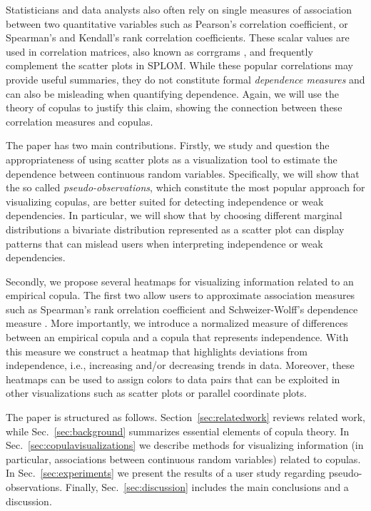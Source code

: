 \documentclass[journal]{vgtc}                %
\begin{document}
Statisticians and data analysts also often rely on single measures of association between two quantitative variables such as Pearson's correlation coefficient, or Spearman's and Kendall's rank correlation coefficients. These scalar values are used in correlation matrices, also known as corrgrams \cite{Friendly02}, and frequently complement the scatter plots in SPLOM. While these popular correlations may provide useful summaries, they do not constitute formal \textit{dependence measures} and can also be misleading when quantifying dependence. Again, we will use the theory of copulas to justify this claim, showing the connection between these correlation measures and copulas.


The paper has two main contributions. Firstly, we study and question the appropriateness of using scatter plots as a visualization tool to estimate the dependence between continuous random variables. Specifically, we will show that the so called \textit{pseudo-observations}, which constitute the most popular approach for visualizing copulas, are better suited for detecting independence or weak dependencies. In particular, we will show that by choosing different marginal distributions a bivariate distribution represented as a scatter plot can display patterns that can mislead users when interpreting independence or weak dependencies.

Secondly, we propose several heatmaps for visualizing information related to an empirical copula. The first two allow users to approximate association measures such as Spearman's rank orrelation coefficient and Schweizer-Wolff's dependence measure \cite{Schweizer1981}. More importantly, we introduce a normalized measure of differences between an empirical copula and a copula that represents independence. With this measure we construct a heatmap that highlights deviations from independence, i.e., increasing and/or decreasing trends in data. Moreover, these heatmaps can be used to assign colors to data pairs that can be exploited in other visualizations such as scatter plots or parallel coordinate plots.


The paper is structured as follows. Section~\ref{sec:relatedwork} reviews related work, while Sec.~\ref{sec:background} summarizes essential elements of copula theory. In Sec.~\ref{sec:copulavisualizations} we describe methods for visualizing information (in particular, associations between continuous random variables) related to copulas. In Sec.~\ref{sec:experiments} we present the results of a user study regarding pseudo-observations. Finally, Sec.~\ref{sec:discussion} includes the main conclusions and a discussion.
\end{document}
